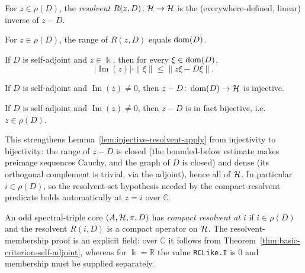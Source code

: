 \begin{definition}[Resolvent]
  \label{def:resolvent}
  \leanok
  For $z \in \rho(D)$, the \emph{resolvent} $R(z, D) \colon \mathcal{H} \to \mathcal{H}$ is the
  (everywhere-defined, linear) inverse of $z - D$.
\end{definition}

\begin{lemma}
  \label{lem:range-resolvent}
  \leanok
  For $z \in \rho(D)$, the range of $R(z, D)$ equals $\operatorname{dom}(D)$.
\end{lemma}

\begin{lemma}
  \label{lem:norm-resolvent-apply-ge}
  \leanok
  If $D$ is self-adjoint and $z \in \Bbbk$, then for every $\xi \in \operatorname{dom}(D)$,
  \[
    |\operatorname{Im}(z)| \cdot \|\xi\| \leq \|z\xi - D\xi\|.
  \]
\end{lemma}

\begin{lemma}
  \label{lem:injective-resolvent-apply}
  \leanok
  If $D$ is self-adjoint and $\operatorname{Im}(z) \neq 0$, then $z - D \colon \operatorname{dom}(D) \to \mathcal{H}$
  is injective.
\end{lemma}

\begin{theorem}
  \label{thm:basic-criterion-self-adjoint}
  \leanok
  If $D$ is self-adjoint and $\operatorname{Im}(z) \neq 0$, then $z - D$ is in fact bijective,
  i.e.\ $z \in \rho(D)$.

  This strengthens Lemma~\ref{lem:injective-resolvent-apply} from injectivity to bijectivity:
  the range of $z - D$ is closed (the bounded-below estimate makes preimage sequences Cauchy,
  and the graph of $D$ is closed) and dense (its orthogonal complement is trivial, via the
  adjoint), hence all of $\mathcal{H}$. In particular $i \in \rho(D)$, so the resolvent-set hypothesis
  needed by the compact-resolvent predicate holds automatically at $z = i$ over $\mathbb C$.
\end{theorem}

\begin{definition}
  \label{def:compact-resolvent-spectral-triple}
  \leanok
  An odd spectral-triple core $(A, \mathcal{H}, \pi, D)$ has \emph{compact resolvent at $i$} if
  $i \in \rho(D)$ and the resolvent $R(i,D)$ is a compact operator on $\mathcal{H}$.  The
  resolvent-membership proof is an explicit field: over $\mathbb C$ it follows from
  Theorem~\ref{thm:basic-criterion-self-adjoint}, whereas for $\Bbbk=\mathbb R$ the value
  \texttt{RCLike.I} is $0$ and membership must be supplied separately.
\end{definition}

